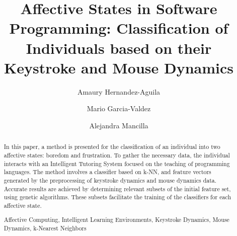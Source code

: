 \documentclass[runningheads,a4paper]{llncs}
\newcommand{\keywords}[1]{\par\addvspace\baselineskip
\noindent\keywordname\enspace\ignorespaces#1}
\begin{document}
\mainmatter  %

\title{Affective States in Software Programming: Classification of Individuals based on their Keystroke and Mouse
Dynamics}


%
%
\author{Amaury Hernandez-Aguila%
\and Mario Garcia-Valdez\and Alejandra Mancilla}
%

\institute{Instituto Tecnológico de Tijuana\\
Calzada Tecnologico s/n, Tijuana, Mexico\\
\mailsa\\
\mailsb\\
\mailsc\\
\url{}}

%
%

\maketitle


\begin{abstract}
  In this paper, a method is presented for the classification of an individual into two affective states: boredom and frustration. To gather the necessary data, the individual interacts with an Intelligent Tutoring System focused on the teaching of programming languages. The method involves a classifier based on k-NN, and feature vectors generated by the preprocessing of keystroke dynamics and mouse dynamics data. Accurate results are achieved by determining relevant subsets of the initial feature set, using genetic algorithms. These subsets facilitate the training of the classifiers for each affective state.
\keywords{Affective Computing, Intelligent Learning Environments, Keystroke Dynamics, Mouse Dynamics, k-Nearest Neighbors}
\end{abstract}
\end{document}
